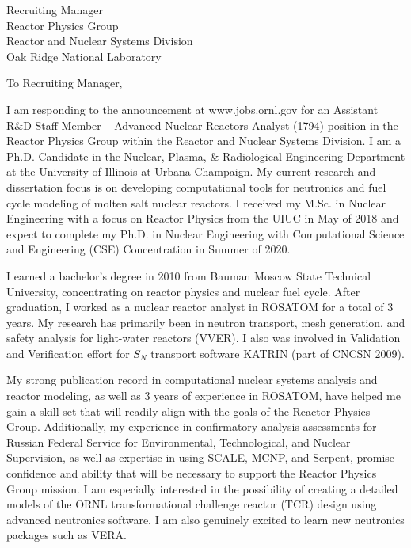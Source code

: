 \documentclass[11pt]{letter} %
\newcommand{\RecipientName}{Recruiting Manager\xspace}
\newcommand{\RecipientAddress}{Reactor Physics Group\\ Reactor and Nuclear Systems Division\\ Oak Ridge National Laboratory}
\begin{document}
\begin{letter}{\RecipientName\\
        \RecipientAddress\xspace}

\address{Andrei Rykhlevskii\\
andreir2@illinois.edu\\
226 Talbot Laboratory\\
104 Wright Street\\
Urbana, IL 61801}


\opening{To \RecipientName,}

I am responding to the announcement at www.jobs.ornl.gov for an Assistant R\&D Staff Member -- Advanced Nuclear Reactors Analyst (1794) position in the Reactor Physics Group within the Reactor and Nuclear Systems Division. I am a Ph.D. Candidate in the Nuclear, 
Plasma, \& Radiological Engineering Department at the University of Illinois 
at Urbana-Champaign. My current research and dissertation focus is on 
developing computational tools for neutronics and fuel cycle modeling of molten salt nuclear reactors.  I received my M.Sc. in Nuclear Engineering with a focus on Reactor Physics from the UIUC in May of 2018 and expect to complete my Ph.D. in Nuclear Engineering with Computational Science and Engineering (CSE) Concentration in Summer of 2020.

I earned a bachelor’s degree in 2010 from Bauman Moscow State Technical 
University, concentrating on reactor physics and nuclear fuel cycle. After 
graduation, I worked as a nuclear reactor analyst in ROSATOM for a total of 3 
years. My research has primarily been in neutron transport, mesh generation, 
and safety analysis for light-water reactors (VVER). I also was involved in 
Validation and Verification effort for $S_N$ transport software KATRIN (part of CNCSN 2009).

My strong publication record in computational nuclear systems analysis and reactor modeling, as well as 3 years of experience in ROSATOM, have helped me gain a skill set that will readily align with the goals of the Reactor Physics Group. Additionally, my experience in confirmatory analysis assessments for 
Russian Federal Service for Environmental, Technological, and Nuclear Supervision, as well as expertise in using SCALE, MCNP, and Serpent, promise confidence and ability that will be necessary to support the Reactor Physics Group mission. I am especially interested in the possibility of creating a detailed models of the ORNL transformational challenge reactor (TCR) design using advanced neutronics software. I am also genuinely excited to learn new neutronics packages such as VERA.


\end{letter}
\end{document}
